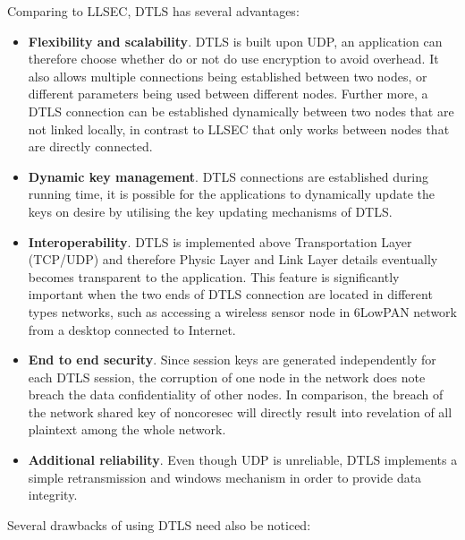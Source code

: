 Comparing to LLSEC, DTLS has several advantages:
\begin{itemize}
\item \textbf{Flexibility and scalability}. DTLS is built upon UDP, an application can therefore choose whether do or not do use encryption to avoid overhead. It also allows multiple connections being established between two nodes, or different parameters being used between different nodes. Further more, a DTLS connection can be established dynamically between two nodes that are not linked locally, in contrast to LLSEC that only works between nodes that are directly connected.
\item \textbf{Dynamic key management}. DTLS connections are established during running time, it is possible for the applications to dynamically update the keys on desire by utilising the key updating mechanisms of DTLS.
\item \textbf{Interoperability}. DTLS is implemented above Transportation Layer (TCP/UDP) and therefore Physic Layer and Link Layer details eventually becomes transparent to the application. This feature is significantly important when the two ends of DTLS connection are located in different types networks, such as accessing a wireless sensor node in 6LowPAN network from a desktop connected to Internet. 
\item \textbf{End to end security}. Since session keys are generated independently for each DTLS session, the corruption of one node in the network does note breach the data confidentiality of other nodes. In comparison, the breach of the network shared key of noncoresec will directly result into revelation of all plaintext among the whole network.
\item \textbf{Additional reliability}. Even though UDP is unreliable, DTLS implements a simple retransmission and windows mechanism in order to provide data integrity.
\end{itemize}

Several drawbacks of using DTLS need also be noticed:

